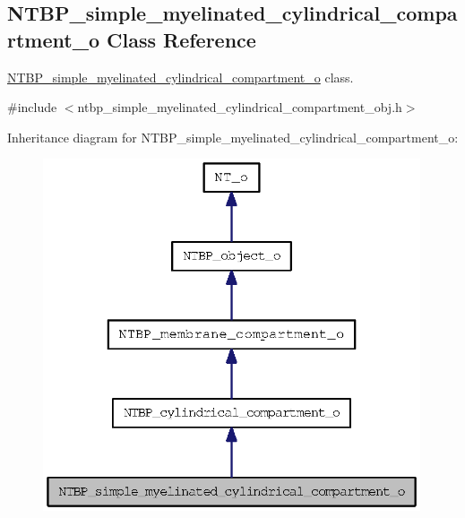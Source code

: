 \subsection{NTBP\_\-simple\_\-myelinated\_\-cylindrical\_\-compartment\_\-o Class Reference}
\label{class_n_t_b_p__simple__myelinated__cylindrical__compartment__o}


\hyperlink{class_n_t_b_p__simple__myelinated__cylindrical__compartment__o}{NTBP\_\-simple\_\-myelinated\_\-cylindrical\_\-compartment\_\-o} class.  




{\ttfamily \#include $<$ntbp\_\-simple\_\-myelinated\_\-cylindrical\_\-compartment\_\-obj.h$>$}



Inheritance diagram for NTBP\_\-simple\_\-myelinated\_\-cylindrical\_\-compartment\_\-o:
\nopagebreak
\begin{figure}[H]
\begin{center}
\leavevmode
\includegraphics[width=316pt]{class_n_t_b_p__simple__myelinated__cylindrical__compartment__o__inherit__graph}
\end{center}
\end{figure}


